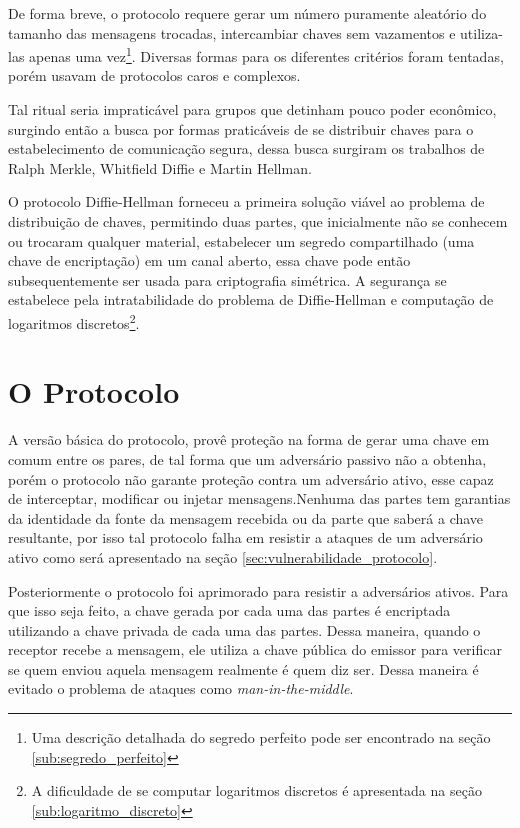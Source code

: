 \documentclass{article}
\begin{document}
De forma breve, o protocolo requere gerar um número puramente aleatório do tamanho das
mensagens trocadas, intercambiar chaves sem vazamentos e utiliza-las apenas uma vez\footnote{Uma descrição detalhada do segredo perfeito pode ser encontrado na
seção \ref{sub:segredo_perfeito}}.
Diversas formas para os diferentes critérios foram tentadas, porém usavam de
protocolos caros e complexos\cite{matsumoto1987key,Merkle}.

Tal ritual seria impraticável para grupos que detinham pouco poder econômico,
surgindo então a busca por formas praticáveis de se distribuir chaves para o
estabelecimento de comunicação segura, dessa busca surgiram os trabalhos de
Ralph Merkle, Whitfield Diffie e Martin Hellman.

O protocolo Diffie-Hellman forneceu a primeira solução viável ao problema
de distribuição de chaves, permitindo duas partes, que inicialmente não se
conhecem ou trocaram qualquer material, estabelecer um segredo compartilhado
(uma chave de encriptação) em um canal aberto, essa chave pode então
subsequentemente ser usada para criptografia simétrica. A segurança se
estabelece pela intratabilidade do problema de
Diffie-Hellman\cite{katz1996handbook} e computação de logaritmos
discretos\footnote{A dificuldade de se computar logaritmos discretos é
apresentada na seção \ref{sub:logaritmo_discreto}}.

\section{O Protocolo}%
\label{sec:o_protocolo}

A versão básica do protocolo, provê proteção na forma de gerar uma
chave em comum entre os pares, de tal forma que um adversário passivo não a obtenha,
porém o protocolo não garante proteção contra um adversário ativo, esse capaz
de interceptar, modificar ou injetar mensagens.Nenhuma das partes tem
garantias da identidade da fonte da mensagem recebida ou da parte que saberá
a chave resultante\cite{katz1996handbook}, por isso tal protocolo falha em
resistir a ataques de um adversário ativo como será apresentado na seção
\ref{sec:vulnerabilidade_protocolo}.

Posteriormente o protocolo foi aprimorado para resistir a adversários ativos. Para que isso seja feito, a chave gerada por cada uma das partes é encriptada utilizando a chave privada de cada uma das partes. Dessa maneira, quando o receptor recebe a mensagem, ele utiliza a chave pública do emissor para verificar se quem enviou aquela mensagem realmente é quem diz ser. Dessa maneira é evitado o problema de ataques como \textit{man-in-the-middle}.
\end{document}
